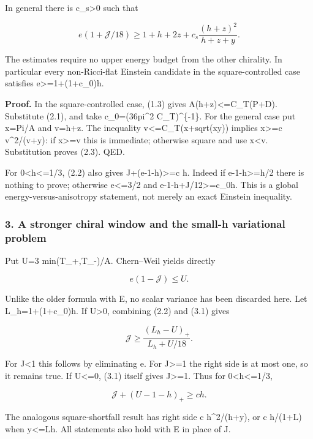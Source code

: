 \documentclass[
  10pt,
]{article}
\begin{document}
In general there is c\_s\textgreater0 such that

\[
 \boxed{e(1+\mathcal J/18)
       \ge1+h+2z+c_s\frac{(h+z)^2}{h+z+y}.}            \tag{2.3}
\]

The estimates require no upper energy budget from the other chirality.
In particular every non-Ricci-flat Einstein candidate in the
square-controlled case satisfies e\textgreater=1+(1+c\_0)h.

\textbf{Proof.} In the square-controlled case, (1.3) gives
A(h+z)\textless=C\_T(P+D). Substitute (2.1), and take c\_0=(36pi\^{}2
C\_T)\^{}\{-1\}. For the general case put x=Pi/A and v=h+z. The
inequality v\textless=C\_T(x+sqrt(xy)) implies x\textgreater=c
v\^{}2/(v+y): if x\textgreater=v this is immediate; otherwise square and
use x\textless v. Substitution proves (2.3). QED.

For 0\textless h\textless=1/3, (2.2) also gives J+(e-1-h)\textgreater=c
h. Indeed if e-1-h\textgreater=h/2 there is nothing to prove; otherwise
e\textless=3/2 and e-1-h+J/12\textgreater=c\_0h. This is a global
energy-versus-anisotropy statement, not merely an exact Einstein
inequality.

\hypertarget{a-stronger-chiral-window-and-the-small-h-variational-problem}{%
\subsubsection{3. A stronger chiral window and the small-h variational
problem}\label{a-stronger-chiral-window-and-the-small-h-variational-problem}}

Put U=3 min(T\_+,T\_-)/A. Chern--Weil yields directly

\[
 e(1-\mathcal J)\le U.                                 \tag{3.1}
\]

Unlike the older formula with E, no scalar variance has been discarded
here. Let L\_h=1+(1+c\_0)h. If U\textgreater0, combining (2.2) and (3.1)
gives

\[
 \boxed{\mathcal J\ge
       \frac{(L_h-U)_+}{L_h+U/18}.}                    \tag{3.2}
\]

For J\textless1 this follows by eliminating e. For J\textgreater=1 the
right side is at most one, so it remains true. If U\textless=0, (3.1)
itself gives J\textgreater=1. Thus for 0\textless h\textless=1/3,

\[
 \mathcal J+(U-1-h)_+\ge c h.                          \tag{3.3}
\]

The analogous square-shortfall result has right side c h\^{}2/(h+y), or
c h/(1+L) when y\textless=Lh. All statements also hold with E in place
of J.
\end{document}
